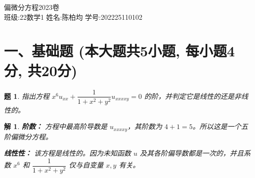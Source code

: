 \documentclass[12pt,a4paper]{article}
\newtheorem{problem}{题}
\newtheorem*{solution}{解}
\begin{document}
	
	\begin{center}
		\LARGE 偏微分方程2023卷 \\
		\vspace{0.5cm}
		\large 班级:22数学1 \quad 姓名:陈柏均 \quad 学号:202225110102
	\end{center}

	
	\section*{一、基础题 (本大题共5小题, 每小题4分, 共20分)}
	
	\begin{problem}
		指出方程 $x^6 u_{xx} + \dfrac{1}{1+x^2+y^2} u_{xxxxy} = 0$ 的阶，并判定它是线性的还是非线性的。
	\end{problem}
	\hrulefill
	\begin{solution}
		\textbf{阶数：} 方程中最高阶导数是 $u_{xxxxy}$，其阶数为 $4+1=5$。所以这是一个五阶偏微分方程。
		
		\noindent
		\textbf{线性性：} 该方程是线性的。因为未知函数 $u$ 及其各阶偏导数都是一次的，并且系数 $x^6$ 和 $\dfrac{1}{1+x^2+y^2}$ 仅与自变量 $x, y$ 有关。
	\end{solution}
	
\end{document}
